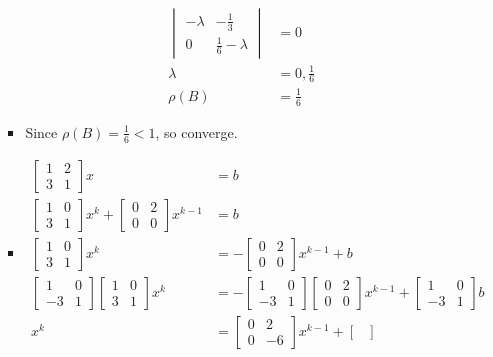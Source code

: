 \documentclass{article}
\begin{document}
\begin{enumerate}
\begin{enumerate}
\begin{itemize}
\begin{align*}
\begin{vmatrix}
-\lambda&-\frac{1}{3}\\0&\frac{1}{6}-\lambda
\end{vmatrix}&=0\\
\lambda &= 0, \frac{1}{6}\\
\rho(B)&= \frac{1}{6}
\end{align*}
\item 
Since $\rho(B)=\frac{1}{6} < 1$, so converge.
\item
\begin{align*}
\begin{bmatrix}
1&2\\3&1
\end{bmatrix} x &= b\\
\begin{bmatrix}
1&0\\3&1
\end{bmatrix} x^{k}+ \begin{bmatrix}
0&2\\0&0
\end{bmatrix} x^{k-1}&= b\\
\begin{bmatrix}
1&0\\3&1
\end{bmatrix} x^{k}&=- \begin{bmatrix}
0&2\\0&0
\end{bmatrix} x^{k-1}+ b\\
\begin{bmatrix}
1&0\\-3&1
\end{bmatrix}\begin{bmatrix}
1&0\\3&1
\end{bmatrix} x^{k}&=- \begin{bmatrix}
1&0\\-3&1
\end{bmatrix}\begin{bmatrix}
0&2\\0&0
\end{bmatrix} x^{k-1}+ \begin{bmatrix}
1&0\\-3&1
\end{bmatrix}b\\
 x^{k}&=\begin{bmatrix}
0&2\\0&-6
\end{bmatrix} x^{k-1}+ \begin{bmatrix}

\end{bmatrix}
\end{align*}
\end{itemize}
\end{enumerate}
\end{enumerate}
\end{document}
